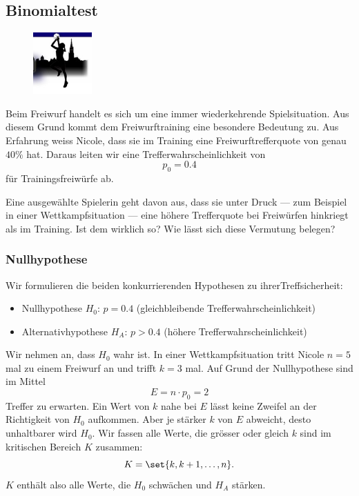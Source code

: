 \documentclass[%
11pt,%
twoside,%
titlepage,%
german,%
headsepline%
]{scrartcl}
\begin{document}
\subsection{Binomialtest}\label{subsec:bspfreiw}

\begin{figure}
  \begin{center}
    \includegraphics[width=0.2\textwidth]{pictures/bcfemina}
  \end{center}
\end{figure}

Beim Freiwurf handelt es sich um eine immer wiederkehrende Spielsituation. Aus diesem Grund kommt dem Freiwurftraining eine besondere Bedeutung zu. Aus Erfahrung weiss Nicole, dass sie im Training eine Freiwurftrefferquote von genau $40\%$ hat. Daraus leiten wir eine Trefferwahrscheinlichkeit von
$$p_0=0.4$$
für Trainingsfreiwürfe ab.

Eine ausgew\"ahlte Spielerin geht davon aus, dass sie unter Druck --- zum Beispiel in einer Wettkampfsituation --- eine höhere Trefferquote bei Freiwürfen hinkriegt als im Training. Ist dem wirklich so? Wie lässt sich diese Vermutung belegen?

\subsubsection{Nullhypothese}

Wir formulieren die beiden konkurrierenden Hypothesen zu ihrerTreffsicherheit:

\begin{itemize}
\item Nullhypothese $H_0$: $p=0.4$ (gleichbleibende Trefferwahrscheinlichkeit)
\item Alternativhypothese $H_A$: $p>0.4$ (höhere Trefferwahrscheinlichkeit)
\end{itemize}

Wir nehmen an, dass $H_0$ wahr ist. In einer Wettkampfsituation tritt Nicole $n=5$ mal zu einem Freiwurf an und trifft $k=3$ mal. Auf Grund der Nullhypothese sind im Mittel
$$E=n\cdot p_0=2$$
Treffer zu erwarten. Ein Wert von $k$ nahe bei $E$ lässt keine Zweifel an der Richtigkeit von $H_0$ aufkommen. Aber je stärker $k$ von $E$ abweicht, desto unhaltbarer wird $H_0$. Wir fassen alle Werte, die grösser oder gleich $k$ sind im kritischen Bereich $K$ zusammen:
$$K=\set{k,k+1,\dots,n}.$$
$K$ enthält also alle Werte, die $H_0$ schwächen und $H_A$ stärken.
\end{document}
